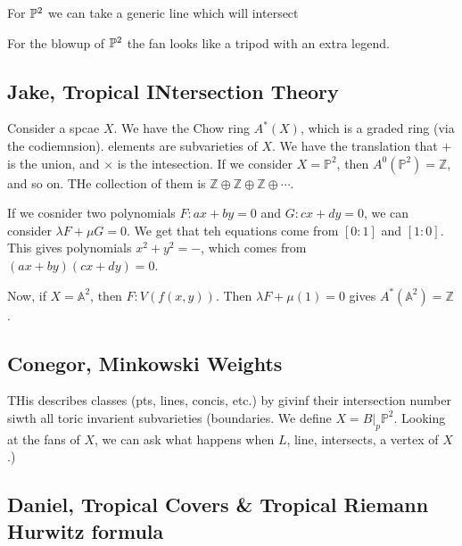 \documentclass[12pt]{memoir}
\theoremstyle{definition}
\def\ZZ{{\mathbb Z}}
\def\PP{{\mathbb P}}
\def\AA{{\mathbb A}}
\begin{document}
\begin{Ex}
    For $\mathbb{P}^2$ we can take a generic line which will intersect 
\end{Ex}

\begin{Ex}
    For the blowup of $\mathbb{P}^2$ the fan looks like a tripod with an extra legend.
\end{Ex}




\subsection{Jake, Tropical INtersection Theory}


Consider a spcae $X$. We have the Chow ring $A^*(X)$, which is a graded ring (via the codiemnsion). elements are subvarieties of $X$. We have the translation that $+$ is the union, and $\times$ is the intesection. If we consider $X=\PP^2$, then $A^0(\PP^2)=\ZZ$, and so on. THe collection of them is $\ZZ \oplus \ZZ \oplus \ZZ \oplus \cdots$. 



If we cosnider two polynomials $F:ax+by=0$ and $G:cx+dy=0$, we can consider $\lambda F+\mu G=0$. We get that teh equations come from $[0:1]$ and $[1:0]$. This gives polynomials $x^2+y^2=-$, which comes from $(ax+by)(cx+dy)=0$.



Now, if $X = \AA^2$, then $F:V(f(x,y))$. Then $\lambda F + \mu(1) =0$ gives $A^*(\AA^2) = \ZZ$.



\subsection{Conegor, Minkowski Weights}



THis describes classes (pts, lines, concis, etc.) by givinf their intersection number siwth all toric invarient subvarieties (boundaries. We define $X = B|_p \PP^2$. Looking at the fans of $X$, we can ask what happens when $L$, line, intersects, a vertex of $X$.)



\subsection{Daniel, Tropical Covers \& Tropical Riemann Hurwitz formula}
\end{document}
